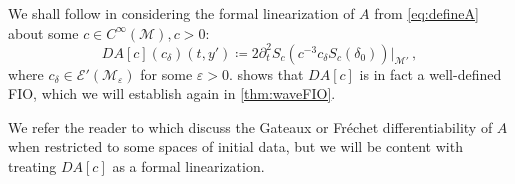 \documentclass[
	fontsize=11pt, 
	twoside=false, 
	abstract=true, 
	a4paper,
]{scrartcl}
\newcommand{\eps}{\varepsilon}
\newcommand{\del}{\partial}
\begin{document}
%
We shall follow \cite{zbMATH04097945,zbMATH01725533,zbMATH05655830} in considering the formal linearization of $A$ from \cref{eq:defineA} about some $c \in C^\infty(\mathcal{M}), c>0$:
\begin{equation}\label{eq:der1}
		DA[c](c_\delta)(t,y') \coloneqq 2\del_t^2 S_{c}\left(c^{-3} c_\delta S_{c}(\delta_0)\right)\Big\vert_{\mathcal{M}'}\,,
\end{equation}
where $c_\delta \in \mathcal{E}'(\mathcal{M}_\eps)$ for some $\eps>0$. \cite{zbMATH04097945} shows that $DA[c]$ is in fact a well-defined FIO, which we will establish again in \cref{thm:waveFIO}.

We refer the reader to \cite{stolkthesis,zbMATH06386318} which discuss the Gateaux or Fr\'echet differentiability of $A$ when restricted to some spaces of initial data, but we will be content with treating $DA[c]$ as a formal linearization.
\end{document}
